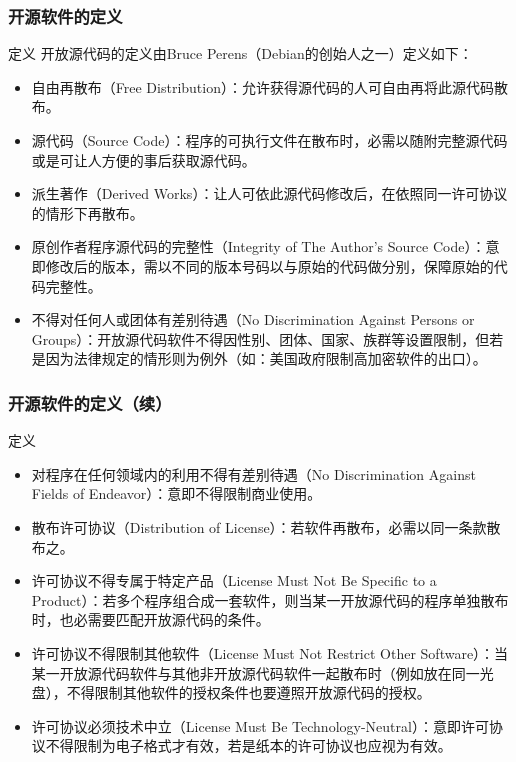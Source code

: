 \documentclass{beamer}
\begin{document}
\begin{frame}
  \frametitle{开源软件的定义}
	\begin{block}{定义}
		开放源代码的定义由Bruce Perens（Debian的创始人之一）定义如下：
		\scriptsize
		\begin{itemize}
			\item 自由再散布（Free Distribution）：允许获得源代码的人可自由再将此源代码散布。
			\item 源代码（Source Code）：程序的可执行文件在散布时，必需以随附完整源代码或是可让人方便的事后获取源代码。
			\item 派生著作（Derived Works）：让人可依此源代码修改后，在依照同一许可协议的情形下再散布。
			\item 原创作者程序源代码的完整性（Integrity of The Author’s Source Code）：意即修改后的版本，需以不同的版本号码以与原始的代码做分别，保障原始的代码完整性。
			\item 不得对任何人或团体有差别待遇（No Discrimination Against Persons or Groups）：开放源代码软件不得因性别、团体、国家、族群等设置限制，但若是因为法律规定的情形则为例外（如：美国政府限制高加密软件的出口）。
		\end{itemize}
	\end{block}
\end{frame}
\begin{frame}
  \frametitle{开源软件的定义（续）}
	\begin{block}{定义}
		\scriptsize
		\begin{itemize}
			\item 对程序在任何领域内的利用不得有差别待遇（No Discrimination Against Fields of Endeavor）：意即不得限制商业使用。
			\item 散布许可协议（Distribution of License）：若软件再散布，必需以同一条款散布之。
			\item 许可协议不得专属于特定产品（License Must Not Be Specific to a Product）：若多个程序组合成一套软件，则当某一开放源代码的程序单独散布时，也必需要匹配开放源代码的条件。
			\item 许可协议不得限制其他软件（License Must Not Restrict Other Software）：当某一开放源代码软件与其他非开放源代码软件一起散布时（例如放在同一光盘），不得限制其他软件的授权条件也要遵照开放源代码的授权。
			\item 许可协议必须技术中立（License Must Be Technology-Neutral）：意即许可协议不得限制为电子格式才有效，若是纸本的许可协议也应视为有效。
		\end{itemize}
	\end{block}
\end{frame}
\end{document}
